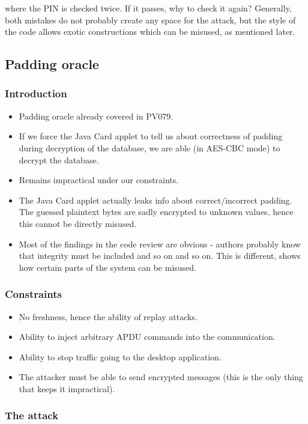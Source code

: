 \documentclass[11pt,a4paper]{article}
\begin{document}
where the PIN is checked twice. If it passes, why to check it again? Generally, both mistakes do not probably create any space for the attack, but the style of the code allows exotic constructions which can be misused, as mentioned later.


\subsection*{Padding oracle}

\subsubsection*{Introduction}

\begin{itemize}
\item  Padding oracle already covered in PV079.
\item If we force the Java Card applet to tell us about correctness of padding during decryption of the database, we are able (in AES-CBC mode) to decrypt the database.
\item Remains impractical under our constraints.
\item The Java Card applet actually leaks info about correct/incorrect padding. The guessed plaintext bytes are sadly encrypted to unknown values, hence this cannot be directly misused. 
\item Most of the findings in the code review are obvious - authors probably know that integrity must be included and so on and so on. This is different, shows how certain parts of the system can be misused. 
\end{itemize}

\subsubsection*{Constraints}
\begin{itemize}
\item No freshness, hence the ability of replay attacks.
\item Ability to inject arbitrary APDU commands into the communication.
\item Ability to stop traffic going to the desktop application.
\item The attacker must be able to send encrypted messages (this is the only thing that keeps it impractical).
\end{itemize}

\subsubsection*{The attack}
\end{document}

